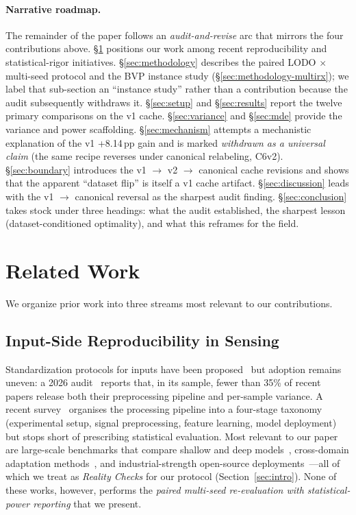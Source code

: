 \documentclass[11pt]{article}
\theoremstyle{definition}
\newcommand{\CSI}{\text{CSI}}
\begin{document}
\paragraph{Narrative roadmap.}
The remainder of the paper follows an \emph{audit-and-revise} arc that mirrors the four contributions above. \S\ref{sec:related} positions our work among recent reproducibility and statistical-rigor initiatives. \S\ref{sec:methodology} describes the paired LODO $\times$ multi-seed protocol and the BVP instance study (\S\ref{sec:methodology-multirx}); we label that sub-section an ``instance study'' rather than a contribution because the audit subsequently withdraws it. \S\ref{sec:setup} and \S\ref{sec:results} report the twelve primary comparisons on the v1 cache. \S\ref{sec:variance} and \S\ref{sec:mde} provide the variance and power scaffolding. \S\ref{sec:mechanism} attempts a mechanistic explanation of the v1 +8.14\,pp gain and is marked \emph{withdrawn as a universal claim} (the same recipe reverses under canonical relabeling, C6v2). \S\ref{sec:boundary} introduces the v1 $\rightarrow$ v2 $\rightarrow$ canonical cache revisions and shows that the apparent ``dataset flip'' is itself a v1 cache artifact. \S\ref{sec:discussion} leads with the v1 $\rightarrow$ canonical reversal as the sharpest audit finding. \S\ref{sec:conclusion} takes stock under three headings: what the audit established, the sharpest lesson (dataset-conditioned optimality), and what this reframes for the field.

\section{Related Work}
\label{sec:related}

We organize prior work into three streams most relevant to our contributions.

\subsection{Input-Side Reproducibility in \CSI{} Sensing}

Standardization protocols for \CSI{} inputs have been proposed~\cite{zhang2026sdp} but adoption remains uneven: a 2026 audit~\cite{guarino2026} reports that, in its sample, fewer than 35\% of recent \CSI{} papers release both their preprocessing pipeline and per-sample variance. A recent survey~\cite{wang2026survey} organises the \CSI{} processing pipeline into a four-stage taxonomy (experimental setup, signal preprocessing, feature learning, model deployment) but stops short of prescribing statistical evaluation. Most relevant to our paper are large-scale benchmarks that compare shallow and deep models~\cite{yang2023sensefi}, cross-domain adaptation methods~\cite{sterzinger2026datta}, and industrial-strength open-source deployments~\cite{cohen2026ruview}---all of which we treat as \emph{Reality Checks} for our protocol (Section~\ref{sec:intro}). None of these works, however, performs the \emph{paired multi-seed re-evaluation with statistical-power reporting} that we present.
\end{document}
